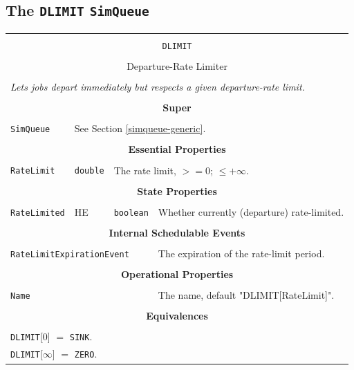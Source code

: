 \documentclass[12pt]{book}
\begin{document}
\subsection{The \lstinline{DLIMIT} \lstinline{SimQueue}}
\label{sec:DLIMIT}

\begin{tabular}{|l|l|l|l|}
\hline
\multicolumn{4}{|c|}{} \\
\multicolumn{4}{|c|}{\lstinline[basicstyle=\large]{DLIMIT}} \\
\multicolumn{4}{|c|}{} \\
\multicolumn{4}{|c|}{Departure-Rate Limiter} \\
\multicolumn{4}{|c|}{} \\
\hline
\multicolumn{4}{|l|}{\em Lets jobs depart immediately but respects a given departure-rate limit.} \\
\hline
\multicolumn{4}{|c|}{} \\
\multicolumn{4}{|c|}{\bf Super} \\
\multicolumn{4}{|c|}{} \\
\hline
\lstinline|SimQueue| & \multicolumn{3}{|l|}{See Section \ref{simqueue-generic}.} \\
\hline
\multicolumn{4}{|c|}{} \\
\multicolumn{4}{|c|}{\bf Essential Properties} \\
\multicolumn{4}{|c|}{} \\
\hline
\lstinline|RateLimit| & \lstinline|double| & \multicolumn{2}{|l|}{The rate limit, $>= 0$; $\leq +\infty$.} \\
\hline
\multicolumn{4}{|c|}{} \\
\multicolumn{4}{|c|}{\bf State Properties} \\
\multicolumn{4}{|c|}{} \\
\hline
\lstinline|RateLimited| & HE & \lstinline|boolean| & Whether currently (departure) rate-limited. \\
\hline
\multicolumn{4}{|c|}{} \\
\multicolumn{4}{|c|}{\bf Internal Schedulable Events} \\
\multicolumn{4}{|c|}{} \\
\hline
\multicolumn{3}{|l|}{\lstinline|RateLimitExpirationEvent|} & The expiration of the rate-limit period. \\
\hline
\multicolumn{4}{|c|}{} \\
\multicolumn{4}{|c|}{\bf Operational Properties} \\
\multicolumn{4}{|c|}{} \\
\hline
\multicolumn{3}{|l|}{\lstinline|Name|} & The name, default "DLIMIT[RateLimit]". \\
\hline
\multicolumn{4}{|c|}{} \\
\multicolumn{4}{|c|}{\bf Equivalences} \\
\multicolumn{4}{|c|}{} \\
\hline
\multicolumn{4}{|l|}{\lstinline|DLIMIT|[$0$] $=$ \lstinline|SINK|.} \\
\multicolumn{4}{|l|}{\lstinline|DLIMIT|[$\infty$] $=$ \lstinline|ZERO|.} \\
\hline
\end{tabular}
\end{document}
